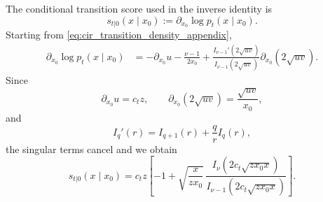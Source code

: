 \documentclass[11pt,twoside,fleqn]{article}
\begin{document}
The conditional transition score used in the inverse identity is
\begin{equation}
    s_{t|0}(x\mid x_0)
    :=
    \partial_{x_0}\log p_t(x\mid x_0).
    \label{eq:cir_conditional_score_def_appendix}
\end{equation}
Starting from \eqref{eq:cir_transition_density_appendix},
\begin{equation}
\begin{aligned}
    \partial_{x_0}\log p_t(x\mid x_0)
    &=
    -\partial_{x_0}u
    -
    \frac{\nu-1}{2x_0}
    +
    \frac{I_{\nu-1}'(2\sqrt{uv})}{I_{\nu-1}(2\sqrt{uv})}
    \partial_{x_0}\!\left(2\sqrt{uv}\right).
\end{aligned}
\label{eq:cir_conditional_score_derivation_1}
\end{equation}
Since
\begin{equation}
    \partial_{x_0}u=c_t z,
    \qquad
    \partial_{x_0}\!\left(2\sqrt{uv}\right)
    =
    \frac{\sqrt{uv}}{x_0},
    \label{eq:cir_conditional_score_derivative_terms}
\end{equation}
and
\begin{equation}
    I_q'(r)
    =
    I_{q+1}(r)+\frac{q}{r}I_q(r),
    \label{eq:cir_bessel_derivative_identity}
\end{equation}
the singular terms cancel and we obtain
\begin{equation}
    s_{t|0}(x\mid x_0)
    =
    c_t z
    \left[
        -1
        +
        \sqrt{\frac{x}{z x_0}}\,
        \frac{
            I_{\nu}\!\left(2c_t\sqrt{z x_0 x}\right)
        }{
            I_{\nu-1}\!\left(2c_t\sqrt{z x_0 x}\right)
        }
    \right].
    \label{eq:cir_conditional_score_appendix}
\end{equation}
\end{document}
